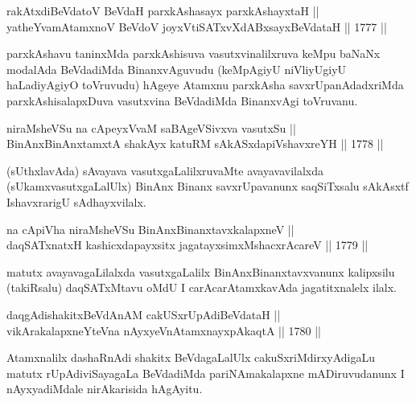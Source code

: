 \begin{shl}
rakAtxdiBeVdatoV BeVdaH parxkAshasayx parxkAshayxtaH || \\
yatheYvamAtamxnoV BeVdoV joyxVtiSATxvXdABxsayxBeVdataH ||  1777 ||  
\end{shl}

\begin{artha}
parxkAshavu taninxMda parxkAshisuva vasutxvinalilxruva keMpu baNaNx
modalAda BeVdadiMda BinanxvAguvudu (keMpAgiyU niVliyUgiyU haLadiyAgiyO
toVruvudu) hAgeye Atamxnu parxkAsha savxrUpanAdadxriMda
parxkAshisalapxDuva vasutxvina BeVdadiMda BinanxvAgi toVruvanu.
\end{artha}


\begin{shl}
niraMsheVSu na cApeyxVvaM saBAgeVSivxva vasutxSu || \\
BinAnxBinAnxtamxtA shakAyx katuRM sAkASxdapiVshavxreYH ||  1778 ||  
\end{shl}

\begin{artha}
(sUthxlavAda) sAvayava vasutxgaLalilxruvaMte avayavavilalxda
(sUkamxvasutxgaLalUlx) BinAnx Binanx savxrUpavanunx saqSiTxsalu
sAkAsxtf IshavxrarigU sAdhayxvilalx.
\end{artha}

\begin{shl}
na cApiVha niraMsheVSu BinAnxBinanxtavxkalapxneV || \\
daqSATxnatxH kashicxdapayxsitx jagatayxsimxMshacxrAcareV ||  1779 ||  
\end{shl}

\begin{artha}
matutx avayavagaLilalxda vasutxgaLalilx BinAnxBinanxtavxvanunx
kalipxsilu (takiRsalu) daqSATxMtavu oMdU I carAcarAtamxkavAda
jagatitxnalelx ilalx.
\end{artha}

\begin{shl}
daqgAdishakitxBeVdAnAM cakUSxrUpAdiBeVdataH || \\
vikArakalapxneYteVna nAyxyeVnA\s \s tamxnayxpAkaqtA ||  1780 || 
\end{shl}

\begin{artha}
Atamxnalilx dashaRnAdi shakitx BeVdagaLalUlx cakuSxriMdirxyAdigaLu
matutx rUpAdiviSayagaLa BeVdadiMda pariNAmakalapxne mADiruvudanunx I
nAyxyadiMdale nirAkarisida hAgAyitu.
\end{artha}

